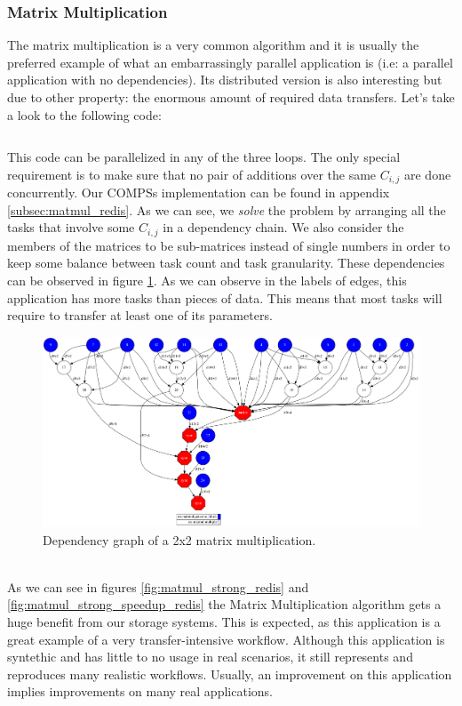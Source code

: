 
\subsubsection{Matrix Multiplication}
\label{subsubsec:matmul_redis}
The matrix multiplication is a very common algorithm and it is usually the preferred example of what an embarrassingly parallel application is (i.e: a parallel application with no dependencies). Its distributed version is also interesting but due to other property: the enormous amount of required data transfers. Let's take a look to the following code:

\inputminted{python}{snippets/matmul_python.py}

This code can be parallelized in any of the three loops. The only special requirement is to make sure that no pair of additions over the same $C_{i, j}$ are done concurrently. Our COMPSs implementation can be found in appendix \ref{subsec:matmul_redis}. As we can see, we \textit{solve} the problem by arranging all the tasks that involve some $C_{i, j}$ in a dependency chain. We also consider the members of the matrices to be sub-matrices instead of single numbers in order to keep some balance between task count and task granularity. These dependencies can be observed in figure \ref{fig:matmul_redis_dep_graph}. As we can observe in the labels of edges, this application has more tasks than pieces of data. This means that most tasks will require to transfer at least one of its parameters.\\
\begin{figure}
\centering
\includegraphics[scale = 0.2]{figures/matmul_storage_dep_graph.png}
\caption{Dependency graph of a 2x2 matrix multiplication.}
\label{fig:matmul_redis_dep_graph}
\end{figure}
\\
As we can see in figures \ref{fig:matmul_strong_redis} and \ref{fig:matmul_strong_speedup_redis} the Matrix Multiplication algorithm gets a huge benefit from our storage systems. This is expected, as this application is a great example of a very transfer-intensive workflow. Although this application is syntethic and has little to no usage in real scenarios, it still represents and reproduces many realistic workflows. Usually, an improvement on this application implies improvements on many real applications.


